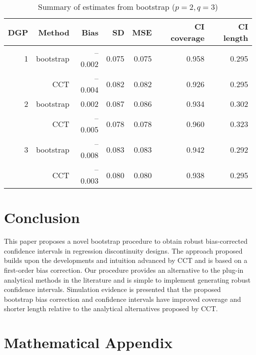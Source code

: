 \documentclass[12pt,fleqn]{article}
\begin{document}
\begin{table}[t]\label{Tb2}
\centering
\begin{tabular}{rrrrrrr}
  \toprule
  DGP & Method    & Bias    & SD    & MSE   & CI coverage & CI length \\
  \midrule
  1   & bootstrap & --0.002 & 0.075 & 0.075 & 0.958       & 0.295     \\
      & CCT       & --0.004 & 0.082 & 0.082 & 0.926       & 0.295     \\
  2   & bootstrap & 0.002   & 0.087 & 0.086 & 0.934       & 0.302     \\
      & CCT       & --0.005 & 0.078 & 0.078 & 0.960       & 0.323     \\
  3   & bootstrap & --0.008 & 0.083 & 0.083 & 0.942       & 0.292     \\
      & CCT       & --0.003 & 0.080 & 0.080 & 0.938       & 0.295     \\
  \bottomrule
\end{tabular}
\caption{Summary of estimates from bootstrap ($p = 2, q = 3$)}
\end{table}

\section{Conclusion}\label{conclusion}
This paper proposes a novel bootstrap procedure to obtain robust bias-corrected
confidence intervals in regression discontinuity designs. 
The approach proposed builds upon the developments and intuition advanced by CCT and is based on a first-order bias correction.
Our procedure provides an alternative to the plug-in analytical methods in the literature and is simple to implement generating robust confidence intervals.
Simulation evidence is presented that the proposed bootstrap bias correction and confidence intervals have improved coverage and shorter length relative to the analytical alternatives proposed by CCT.

\newpage\appendix
\section{Mathematical Appendix}
\end{document}
